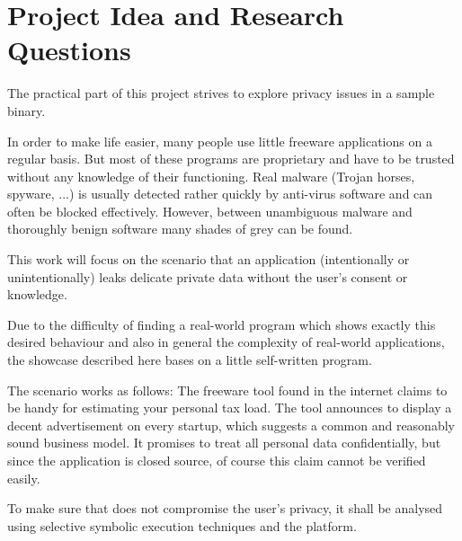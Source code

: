 \section{Project Idea and Research Questions}\label{sec:proj}

The practical part of this project strives to explore privacy issues in a sample binary.

In order to make life easier, many people use little freeware applications on a regular basis.
But most of these programs are proprietary and have to be trusted without any knowledge of their functioning.
Real malware (Trojan horses, spyware, ...) is usually detected rather quickly by anti-virus software and can often be blocked effectively.
However, between unambiguous malware and thoroughly benign software many shades of grey can be found.

This work will focus on the scenario that an application (intentionally or unintentionally) leaks delicate private data without the user's consent or knowledge.


Due to the difficulty of finding a real-world program which shows exactly this desired behaviour and also in general the complexity of real-world applications, the showcase described here bases on a little self-written program.

The scenario works as follows: The freeware tool \app found in the internet claims to be handy for estimating your personal tax load.
The tool announces to display a decent advertisement on every startup, which suggests a common and reasonably sound business model.
It promises to treat all personal data confidentially, but since the application is closed source, of course this claim cannot be verified easily.

To make sure that \app does not compromise the user's privacy, it shall be analysed using selective symbolic execution techniques and the \sse platform.

\bigskip

